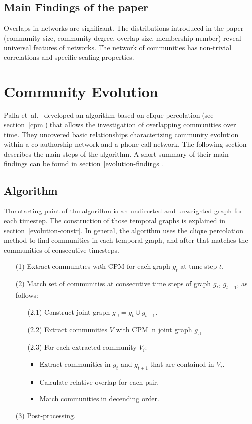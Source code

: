 \documentclass[runningheads,a4paper]{llncs}
\begin{document}
\subsection{Main Findings of the paper}
Overlaps in networks are significant. The distributions introduced in the paper (community size, community degree, overlap size, membership number) reveal universal features of networks. The network of communities has non-trivial correlations and specific scaling properties.~\cite{palla2005uncovering}

\section{Community Evolution}
\label{evolution}
Palla et~al.~\cite{palla2007quantifying} developed an algorithm based on clique percolation (see section~\ref{cpm}) that allows the investigation of overlapping communities over time. They uncovered basic relationships characterizing community evolution within a co-authorship network and a phone-call network. The following section describes the main steps of the algorithm. A short summary of their main findings can be found in section~\ref{evolution-findings}.

\subsection{Algorithm}
\label{evolution-algo}
The starting point of the algorithm is an undirected and unweighted graph for each timestep.
The construction of those temporal graphs is explained in section~\ref{evolution-constr}.
In general, the algorithm uses the clique percolation method to find communities in each temporal graph, and after that matches the communities of consecutive timesteps.

\begin{enumerate}
\small
\item[(1)] Extract communities with CPM for each graph $g_t$ at time step $t$.
\item[(2)] Match set of communities at consecutive time steps of graph $g_t$, $g_{t+1}$, as follows:
	\begin{enumerate}
		\item[(2.1)] Construct joint graph $g_{\cup}=g_t \cup g_{t+1}$.
		\item[(2.2)] Extract communities $V$ with CPM in joint graph $g_{\cup}$.
		\item[(2.3)] For each extracted community $V_i$: 
		\begin{itemize}
			\item Extract communities in $g_t$ and $g_{t+1}$ that are contained in $V_i$.
			\item Calculate relative overlap for each pair.
			\item Match communities in decending order.
		\end{itemize}
	\end{enumerate}
\item[(3)] Post-processing.
\end{enumerate}
\end{document}
